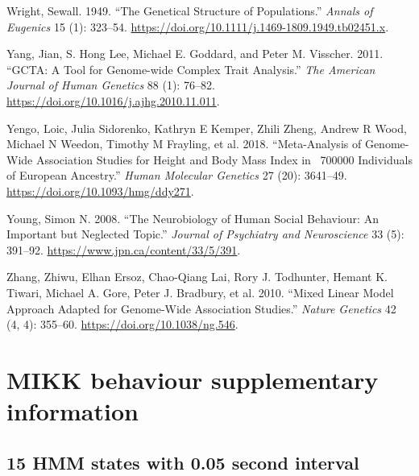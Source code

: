 \documentclass[
]{book}
\newlength{\cslhangindent}
\newlength{\cslentryspacingunit} %
\newenvironment{CSLReferences}[2] %
 {%
  \setlength{\parindent}{0pt}
  \ifodd #1
  \let\oldpar\par
  \def\par{\hangindent=\cslhangindent\oldpar}
  \fi
  \setlength{\parskip}{#2\cslentryspacingunit}
 }%
 {}
\begin{document}
\begin{CSLReferences}{1}{0}
\leavevmode{}%
Wright, Sewall. 1949. {``The {Genetical Structure} of {Populations}.''} \emph{Annals of Eugenics} 15 (1): 323--54. \url{https://doi.org/10.1111/j.1469-1809.1949.tb02451.x}.

\leavevmode{}%
Yang, Jian, S. Hong Lee, Michael E. Goddard, and Peter M. Visscher. 2011. {``{GCTA}: {A Tool} for {Genome-wide Complex Trait Analysis}.''} \emph{The American Journal of Human Genetics} 88 (1): 76--82. \url{https://doi.org/10.1016/j.ajhg.2010.11.011}.

\leavevmode{}%
Yengo, Loic, Julia Sidorenko, Kathryn E Kemper, Zhili Zheng, Andrew R Wood, Michael N Weedon, Timothy M Frayling, et al. 2018. {``Meta-Analysis of Genome-Wide Association Studies for Height and Body Mass Index in ~700000 Individuals of {European} Ancestry.''} \emph{Human Molecular Genetics} 27 (20): 3641--49. \url{https://doi.org/10.1093/hmg/ddy271}.

\leavevmode{}%
Young, Simon N. 2008. {``The Neurobiology of Human Social Behaviour: An Important but Neglected Topic.''} \emph{Journal of Psychiatry and Neuroscience} 33 (5): 391--92. \url{https://www.jpn.ca/content/33/5/391}.

\leavevmode{}%
Zhang, Zhiwu, Elhan Ersoz, Chao-Qiang Lai, Rory J. Todhunter, Hemant K. Tiwari, Michael A. Gore, Peter J. Bradbury, et al. 2010. {``Mixed Linear Model Approach Adapted for Genome-Wide Association Studies.''} \emph{Nature Genetics} 42 (4, 4): 355--60. \url{https://doi.org/10.1038/ng.546}.

\end{CSLReferences}

\hypertarget{appendix-appendix}{%
\appendix}


\hypertarget{mikk-behaviour-supplementary-information}{%
\chapter{MIKK behaviour supplementary information}\label{mikk-behaviour-supplementary-information}}

\hypertarget{hmm-states-with-0.05-second-interval}{%
\section{15 HMM states with 0.05 second interval}\label{hmm-states-with-0.05-second-interval}}
\end{document}
